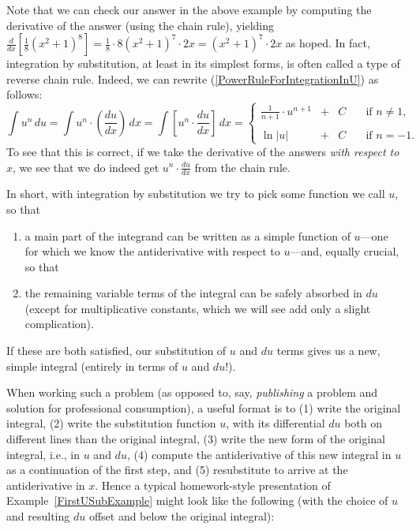 Note that we can check our answer in the above example by
computing the derivative of the answer (using the 
chain rule), yielding $\frac{d}{dx}\left[\frac18(x^2+1)^8\right]=
\frac18\cdot8(x^2+1)^7\cdot2x=
(x^2+1)^7\cdot2x$ as hoped.  
In fact, integration by substitution, at least in its
simplest forms, is often called a type of reverse chain rule.
Indeed, we can rewrite (\ref{PowerRuleForIntegrationInU}) as follows:
\begin{equation}\int u^n\,du=\int u^n\cdot\left(\frac{du}{dx}\right)\,dx
            =\int \left[u^n\cdot\frac{du}{dx}\right]\,dx
=\left\{\begin{array}{lcll}
             \frac1{n+1}\cdot u^{n+1}&+&C\quad&\text{if }n\ne1,\\ \\
             \ln|u|&+&C&\text{if }n=-1.\end{array}\right.
\label{IntPowerRuleWithUSubstitution}\end{equation}
To see that this is correct, if we take the derivative of 
the answers {\it with respect to $x$}, we see that we do indeed
get $u^n\cdot\frac{du}{dx}$ from the chain rule.    

In short, with integration by substitution we try to pick some
function we call $u$, so that
\begin{enumerate}
\item a main part of the integrand can be written as a simple function
      of $u$---one for which we know the antiderivative with respect to 
      $u$---and, equally crucial, so that
\item the remaining variable terms of the integral can be
      safely absorbed in $du$ (except for multiplicative constants,
      which we will see add only a slight complication).
\end{enumerate}
If these are both satisfied, our substitution of $u$ and $du$ terms
gives us a new, simple integral (entirely in terms of $u$ and $du$!).

When working such a problem (as opposed to, say, {\it publishing} a problem
and solution for professional consumption),
a useful format is to (1) write the original integral, (2) write the
substitution function $u$, with its differential $du$ both on different
lines than the original integral, (3) write the new form of
the original integral, i.e.,  in $u$ 
and $du$,  (4) compute the antiderivative of this new integral
in $u$ as a continuation of the first step,
and (5) resubstitute to arrive at the antiderivative in $x$.
Hence a typical homework-style presentation of 
Example~\ref{FirstUSubExample}
might look like the following (with the choice of
$u$ and resulting $du$ offset and below the original integral):

